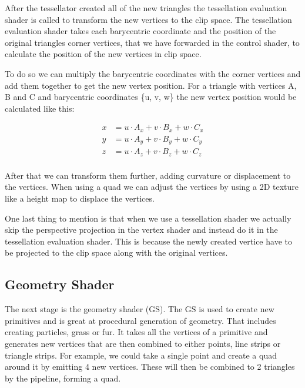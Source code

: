 \documentclass[12pt]{report} \usepackage{preamble}
\begin{document}
After the tessellator created all of the new triangles the tessellation evaluation shader is called to transform the new vertices to the clip space.
The tessellation evaluation shader takes each barycentric coordinate and the position of the original triangles corner vertices, that we have forwarded in
the control shader, to calculate the position of the new vertices in clip space. \cite{tessellation}

To do so we can multiply the barycentric coordinates with the corner vertices and add them together to get the new vertex position.
For a triangle with vertices A, B and C and barycentric coordinates \{u, v, w\} the new vertex position would be calculated like this:

\[
	\begin{aligned}
		x & = u \cdot A_x + v \cdot B_x + w \cdot C_x \\
		y & = u \cdot A_y + v \cdot B_y + w \cdot C_y \\
		z & = u \cdot A_z + v \cdot B_z + w \cdot C_z \\
	\end{aligned}
\]

After that we can transform them further, adding curvature or displacement to the vertices. When using a quad we can adjust the vertices
by using a 2D texture like a height map to displace the vertices. \cite{tessellation}

One last thing to mention is that when we use a tessellation shader we actually skip the perspective projection in the vertex shader and
instead do it in the tessellation evaluation shader. This is because the newly created vertice have to be projected to the clip space
along with the original vertices. \cite{tessellation}

\subsection{Geometry Shader}

The next stage is the geometry shader (GS). The GS is used to create new primitives and is great at procedural generation of geometry.
That includes creating particles, grass or fur. It takes all the vertices of a primitive and generates new vertices that are then combined to
either points, line strips or triangle strips. For example, we could take a single point and create a quad around it by emitting 4 new vertices.
These will then be combined to 2 triangles by the pipeline, forming a quad. \cite{geometry-shader}
\end{document}
